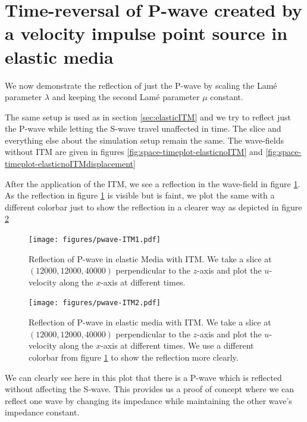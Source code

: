 \section{Time-reversal of P-wave created by a velocity impulse point source in elastic media} \label{sec:elasticITMpwave}
We now demonstrate the reflection of just the P-wave by scaling the Lam\'{e} parameter $\lambda$ and keeping the second Lam\'{e} parameter $\mu$ constant.
\par The same setup is used as in section \ref{sec:elasticITM} and we try to reflect just the P-wave while letting the S-wave travel unaffected in time. The slice
and everything else about the simulation setup remain the same. The wave-fields without \ac{ITM} are given in figures \ref{fig:space-timeplot-elasticnoITM} and
\ref{fig:space-timeplot-elasticnoITMdisplacement}
\par After the application of the \ac{ITM}, we see a reflection in the wave-field in figure \ref{fig:space-timeplot-pwave}.
As the reflection in figure \ref{fig:space-timeplot-pwave} is visible but is faint, we plot the same with a different colorbar just to show the reflection in a clearer
way as depicted in figure \ref{fig:space-timeplot-pwave2}
\begin{figure}[htpb]
    \centering
    \texttt{[image: figures/pwave-ITM1.pdf]}
    \caption{Reflection of P-wave in elastic Media with \ac{ITM}. We take a slice at $\left(12000,12000,40000\right)$ perpendicular to the $z$-axis
    and plot the $u$-velocity along the $x$-axis at different times.}
    \label{fig:space-timeplot-pwave}
\end{figure}

\begin{figure}[htpb] %
    \centering
    \texttt{[image: figures/pwave-ITM2.pdf]}
    \caption{Reflection of P-wave in elastic media with \ac{ITM}. We take a slice at $\left(12000,12000,40000\right)$ perpendicular to the $z$-axis
    and plot the $u$-velocity along the $x$-axis at different times. We use a different colorbar from figure \ref{fig:space-timeplot-pwave} to show the reflection more clearly.}
    \label{fig:space-timeplot-pwave2}
\end{figure}
\par We can clearly see here in this plot that there is a P-wave which is reflected without affecting the S-wave. This provides us a proof of concept where we 
can reflect one wave by changing its impedance while maintaining the other wave's impedance constant.

